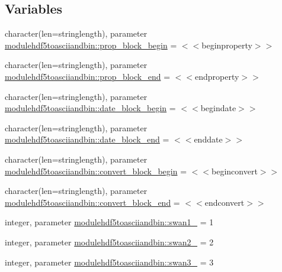 \subsection*{Variables}
\begin{DoxyCompactItemize}
\item 
character(len=stringlength), parameter \mbox{\hyperlink{namespacemodulehdf5toasciiandbin_a4a45dd20b3087c4f7591c88fc4463ab7}{modulehdf5toasciiandbin\+::prop\+\_\+block\+\_\+begin}} = \textquotesingle{}$<$$<$beginproperty$>$$>$\textquotesingle{}
\item 
character(len=stringlength), parameter \mbox{\hyperlink{namespacemodulehdf5toasciiandbin_ad076cbdf7d5abeebbf0c5eb66400d89d}{modulehdf5toasciiandbin\+::prop\+\_\+block\+\_\+end}} = \textquotesingle{}$<$$<$endproperty$>$$>$\textquotesingle{}
\item 
character(len=stringlength), parameter \mbox{\hyperlink{namespacemodulehdf5toasciiandbin_a6b2e6aa427edbd015ad91b9036b78520}{modulehdf5toasciiandbin\+::date\+\_\+block\+\_\+begin}} = \textquotesingle{}$<$$<$begindate$>$$>$\textquotesingle{}
\item 
character(len=stringlength), parameter \mbox{\hyperlink{namespacemodulehdf5toasciiandbin_ae29bb64f764920d560527391a2d97a1f}{modulehdf5toasciiandbin\+::date\+\_\+block\+\_\+end}} = \textquotesingle{}$<$$<$enddate$>$$>$\textquotesingle{}
\item 
character(len=stringlength), parameter \mbox{\hyperlink{namespacemodulehdf5toasciiandbin_a6740560c9f2f911f85b3ec6172db1644}{modulehdf5toasciiandbin\+::convert\+\_\+block\+\_\+begin}} = \textquotesingle{}$<$$<$beginconvert$>$$>$\textquotesingle{}
\item 
character(len=stringlength), parameter \mbox{\hyperlink{namespacemodulehdf5toasciiandbin_a7016ca478716e59fb0f7cdb3048a2378}{modulehdf5toasciiandbin\+::convert\+\_\+block\+\_\+end}} = \textquotesingle{}$<$$<$endconvert$>$$>$\textquotesingle{}
\item 
integer, parameter \mbox{\hyperlink{namespacemodulehdf5toasciiandbin_af23b86d1609b710e8df5f28714b04bbf}{modulehdf5toasciiandbin\+::swan1\+\_\+}} = 1
\item 
integer, parameter \mbox{\hyperlink{namespacemodulehdf5toasciiandbin_a16b22f5b41bd511f717c0a4f238a254a}{modulehdf5toasciiandbin\+::swan2\+\_\+}} = 2
\item 
integer, parameter \mbox{\hyperlink{namespacemodulehdf5toasciiandbin_a5b91bc93f3d72b0cb8be873dcca9bd34}{modulehdf5toasciiandbin\+::swan3\+\_\+}} = 3
\item 

\end{DoxyCompactItemize}

